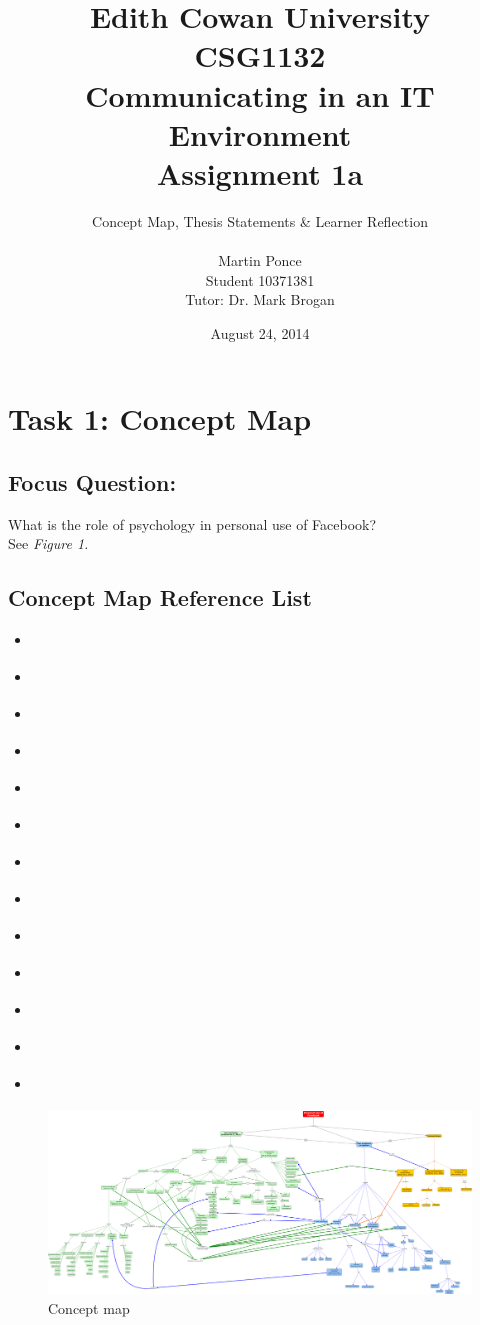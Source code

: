 \documentclass[12pt,a4paper]{report}
\title{Edith Cowan University\\CSG1132\\Communicating in an IT Environment\\Assignment 1a}
\author{Concept Map, Thesis Statements \& Learner Reflection\\\\
		Martin Ponce\\Student 10371381\\Tutor: Dr. Mark Brogan}
\date{August 24, 2014}
\begin{document}
\maketitle

\makeatletter
\tableofcontents

\newpage
\section*{\textsf{Task 1: Concept Map}}

\subsection*{\textsf{Focus Question:}}
What is the role of psychology in personal use of Facebook?\\

See \emph{Figure 1.}

\subsection*{\textsf{Concept Map Reference List}}
\begin{itemize}
\item \citet*{Pai2013}
\item \citet*{McAndrew2012}
\item \citet*{Nadkarni2012}
\item \citet*{Moore2012}
\item \citet*{Ross2009}
\item \citet*{Toma2013}
\item \citet*{Ellison2007}
\item \citet*{Park2011}
\item \citet*{Anderson2012}
\item \citet*{Ku2013}
\item \citet*{Rosen2013}
\item \citet*{Trottier2012}
\item \citet*{Kwan2013}
\end{itemize}

\newpage
{}
\thispagestyle{fancylscape}
\begin{landscape}
\begin{figure}[H]
	\centering
	\caption{Concept map}
	\includegraphics[scale=0.16]{./img/CSG1132_Facebook_Cmap_v9.png}
\end{figure}
\end{landscape}
\restoregeometry
\end{document}
